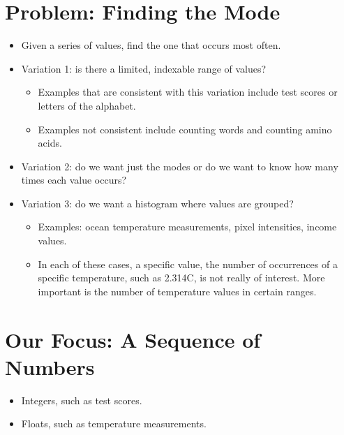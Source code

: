 \documentclass[letterpaper,10pt,english]{sphinxmanual}
\begin{document}
\section{Problem: Finding the Mode}
\label{\detokenize{lecture_notes/lec14_design_part1:problem-finding-the-mode}}\begin{itemize}
\item {} 
Given a series of values, find the one that occurs most often.

\item {} 
Variation 1: is there a limited, indexable range of values?
\begin{itemize}
\item {} 
Examples that are consistent with this variation include test
scores or letters of the alphabet.

\item {} 
Examples not consistent include counting words and counting amino
acids.

\end{itemize}

\item {} 
Variation 2: do we want just the modes or do we want to know how many
times each value occurs?

\item {} 
Variation 3: do we want a histogram where values are grouped?
\begin{itemize}
\item {} 
Examples: ocean temperature measurements, pixel intensities, income
values.

\item {} 
In each of these cases, a specific value, the number of
occurrences of a specific temperature, such as 2.314C, is not really of
interest. More important is the number of temperature values in
certain ranges.

\end{itemize}

\end{itemize}


\section{Our Focus: A Sequence of Numbers}
\label{\detokenize{lecture_notes/lec14_design_part1:our-focus-a-sequence-of-numbers}}\begin{itemize}
\item {} 
Integers, such as test scores.

\item {} 
Floats, such as temperature measurements.

\end{itemize}
\end{document}
